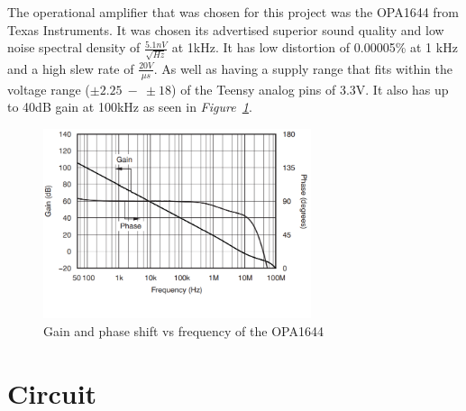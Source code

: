 The operational amplifier that was chosen for this project was the OPA1644 from Texas Instruments.
It was chosen its advertised superior sound quality and low noise spectral density of $\frac{5.1nV}{\sqrt{Hz}}$ at 1kHz.
It has low distortion of 0.00005\% at 1 kHz and a high slew rate of $\frac{20V}{\mu s}$.
As well as having a supply range that fits within the voltage range ($\pm2.25~-~\pm18$) of the Teensy analog pins of 3.3V\cite{noauthor_opa164x_nodate}.
It also has up to 40dB gain at 100kHz as seen in \textit{Figure~\ref{fig:dbvsFreq}}.

\begin{figure}[h]
    \centering
    \includegraphics[width=0.7\textwidth]{graphics/dbVsfreq.png}
    \caption{Gain and phase shift vs frequency of the OPA1644\cite{noauthor_opa164x_nodate}}
    \label{fig:dbvsFreq}
\end{figure}




\section{Circuit}\label{sec:CircResult}

